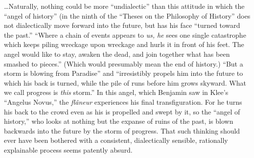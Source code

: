 \documentclass[12pt]{tufte-handout}
\begin{document}
\ldots Naturally, nothing could be more \enquote{undialectic} than this attitude in which the \enquote{angel of history} (in the ninth of the \enquote{Theses on the Philosophy of History} does not dialectically move forward into the future, but has his face \enquote{turned toward the past.} \enquote{Where a chain of events appears to \textit{us, he} sees one single catastrophe which keeps piling wreckage upon wreckage and hurls it in front of his feet. The angel would like to stay, awaken the dead, and join together what has been smashed to pieces.} (Which would presumably mean the end of history.) \enquote{But a storm is blowing from Paradise} and \enquote{irresistibly propels him into the future to which his back is turned, while the pile of runs before him grows skyward. What we call progress is \textit{this} storm.} In this angel, which Benjamin saw in Klee's \enquote{Angelus Novus,} the \textit{fl\^{a}neur} experiences his final transfiguration. For he turns his back to the crowd even as his is propelled and swept by it, so the \enquote{angel of history,} who looks at nothing but the expanse of ruins of the past, is blown backwards into the future by the storm of progress. That such thinking should ever have been bothered with a consistent, dialectically sensible, rationally explainable process seems patently absurd.\cite{arendt1968men}

\nocite{*}
{\footnotesize


}
\end{document}
